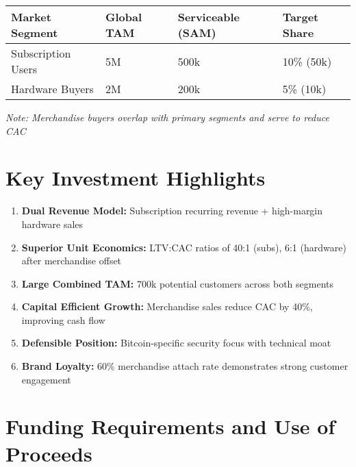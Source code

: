 \documentclass[11pt]{article}
\begin{document}
\begin{table}[H]
\centering
\begin{tabularx}{\linewidth}{l Y Y Y}
\toprule
Market Segment & Global TAM\cite{chainalysis2024,triple2023} & Serviceable (SAM) & Target Share \\\midrule
Subscription Users & 5M & 500k & 10\% (50k) \\
Hardware Buyers & 2M & 200k & 5\% (10k) \\
\bottomrule
\end{tabularx}
\end{table}
\textit{Note: Merchandise buyers overlap with primary segments and serve to reduce CAC}

\section{Key Investment Highlights}

\begin{enumerate}
  \item \textbf{Dual Revenue Model:} Subscription recurring revenue + high-margin hardware sales
  \item \textbf{Superior Unit Economics:} LTV:CAC ratios of 40:1 (subs), 6:1 (hardware) after merchandise offset
  \item \textbf{Large Combined TAM:} 700k potential customers across both segments
  \item \textbf{Capital Efficient Growth:} Merchandise sales reduce CAC by 40\%, improving cash flow
  \item \textbf{Defensible Position:} Bitcoin-specific security focus with technical moat
  \item \textbf{Brand Loyalty:} 60\% merchandise attach rate demonstrates strong customer engagement
\end{enumerate}

\section{Funding Requirements and Use of Proceeds}
\end{document}
